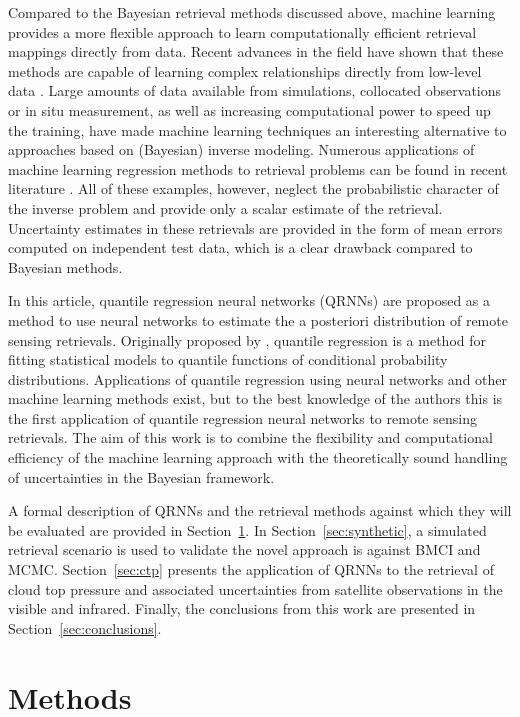 \documentclass[journal abbreviation, manuscript]{copernicus}
\begin{document}
Compared to the Bayesian retrieval methods discussed above, machine learning
provides a more flexible approach to learn computationally efficient retrieval
mappings directly from data. Recent advances in the field have shown that
these methods are capable of learning complex relationships directly from
low-level data \citep{lecun}. Large amounts of data available from simulations,
collocated observations or in situ measurement, as well as increasing computational
 power to speed up the training, have made machine learning techniques
an interesting alternative to approaches based on (Bayesian) inverse modeling.
Numerous applications of machine learning regression methods to retrieval
problems can be found in recent literature \citep{holl, strandgren, wang, hakansson, brath}.
All of these examples, however, neglect the probabilistic character of the
inverse problem and provide only a scalar estimate of the retrieval. Uncertainty
estimates in these retrievals are provided in the form of mean errors
computed on independent test data, which is a clear drawback compared to
Bayesian methods.

In this article, quantile regression neural networks (QRNNs) are proposed as a
method to use neural networks to estimate the a posteriori distribution of
remote sensing retrievals. Originally proposed by \citet{koenker_bassett},
quantile regression is a method for fitting statistical models to quantile
functions of conditional probability distributions. Applications of quantile
regression using neural networks \citep{cannon} and other machine learning
methods \citep{meinshausen} exist, but to the best knowledge of the authors this
is the first application of quantile regression neural networks to remote
sensing retrievals. The aim of this work is to combine the flexibility and
computational efficiency of the machine learning approach with the theoretically
sound handling of uncertainties in the Bayesian framework.

A formal description of QRNNs and the retrieval methods against which they will
be evaluated are provided in Section~\ref{sec:methods}. In
Section~\ref{sec:synthetic}, a simulated retrieval scenario is used to validate
the novel approach is against BMCI and MCMC. Section~\ref{sec:ctp} presents the
application of QRNNs to the retrieval of cloud top pressure and associated
uncertainties from satellite observations in the visible and infrared. Finally,
the conclusions from this work are presented in Section~\ref{sec:conclusions}.

\section{Methods}
\label{sec:methods}
\end{document}
